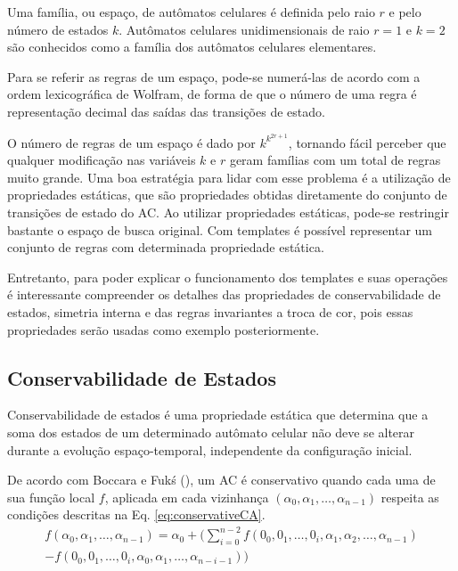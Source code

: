 \documentclass[12pt, a4paper]{article}
\begin{document}
Uma família, ou espaço, de autômatos celulares é definida pelo raio $r$ e pelo número de estados $k$. Autômatos celulares unidimensionais de raio $r=1$ e $k=2$ são conhecidos como a família dos autômatos celulares elementares.

Para se referir as regras de um espaço, pode-se numerá-las de acordo com a ordem lexicográfica de Wolfram, de forma de que o número de uma regra é representação decimal das saídas das transições de estado.

O número de regras de um espaço é dado por $k^{k^{2r+1}}$, tornando fácil perceber que qualquer modificação nas variáveis $k$ e $r$ geram famílias com um total de regras muito grande. Uma boa estratégia para lidar com esse problema é a utilização de propriedades estáticas, que são propriedades obtidas diretamente do conjunto de transições de estado do AC. Ao utilizar propriedades estáticas, pode-se restringir bastante o espaço de busca original. Com templates é possível representar um conjunto de regras com determinada propriedade estática.

Entretanto, para poder explicar o funcionamento dos templates e suas operações é interessante compreender os detalhes das propriedades de conservabilidade de estados, simetria interna e das regras invariantes a troca de cor, pois essas propriedades serão usadas como exemplo posteriormente.

\subsection{Conservabilidade de Estados}
Conservabilidade de estados é uma propriedade estática que determina que a soma dos estados de um determinado autômato celular não deve se alterar durante a evolução espaço-temporal, independente da configuração inicial.

De acordo com Boccara e Fukś (\citeyear{boccara2002}), um AC é conservativo quando cada uma de sua função local $f$, aplicada em cada vizinhança $(\alpha_0,\alpha_1, \dots, \alpha_{n-1})$ respeita as condições descritas na Eq. \eqref{eq:conservativeCA}.
\begin{equation}
\begin{split}
f(\alpha_0,\alpha_1, \dots,\alpha_{n-1}) = \alpha_0 + (\sum_{i=0}^{n-2}f(0_0,0_1, \dots,0_i,\alpha_1,\alpha_2, \dots,\alpha_{n-1}) \\- f(0_0,0_1, \dots,0_i,\alpha_0,\alpha_1, \dots,\alpha_{n-i-1}))
\label{eq:conservativeCA}
\end{split}
\end{equation}
\end{document}

